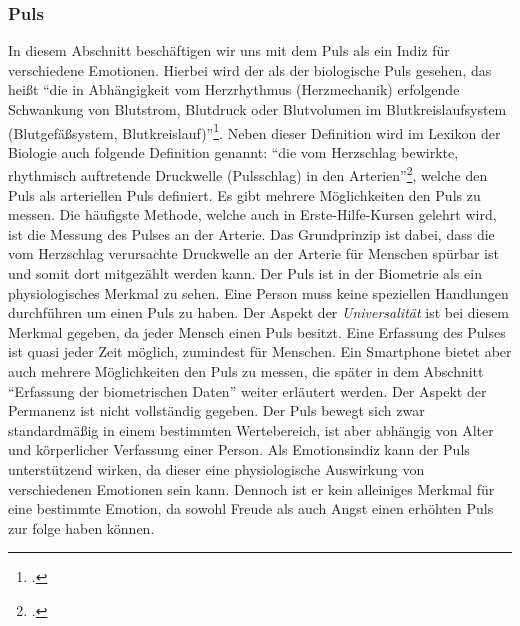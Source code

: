 \subsubsection{Puls}
In diesem Abschnitt beschäftigen wir uns mit dem Puls als ein Indiz für verschiedene Emotionen. Hierbei wird der als der biologische Puls gesehen, das heißt ``die in Abhängigkeit vom Herzrhythmus (Herzmechanik) erfolgende Schwankung von Blutstrom, Blutdruck oder Blutvolumen im Blutkreislaufsystem (Blutgefäßsystem, Blutkreislauf)''\footcite{Spe18}. Neben dieser Definition wird im Lexikon der Biologie auch folgende Definition genannt: ``die vom Herzschlag bewirkte, rhythmisch auftretende Druckwelle (Pulsschlag) in den Arterien''\footcite{Spe18}, welche den Puls als arteriellen Puls definiert. \newline
Es gibt mehrere Möglichkeiten den Puls zu messen. Die häufigste Methode, welche auch in Erste-Hilfe-Kursen gelehrt wird, ist die Messung des Pulses an der Arterie. Das Grundprinzip ist dabei, dass die vom Herzschlag verursachte Druckwelle an der Arterie für Menschen spürbar ist und somit dort mitgezählt werden kann.\newline
Der Puls ist in der Biometrie als ein physiologisches Merkmal zu sehen. Eine Person muss keine speziellen Handlungen durchführen um einen Puls zu haben. Der Aspekt der \textit{Universalität} ist bei diesem Merkmal gegeben, da jeder Mensch einen Puls besitzt. Eine Erfassung des Pulses ist quasi jeder Zeit möglich, zumindest für Menschen. Ein Smartphone bietet aber auch mehrere Möglichkeiten den Puls zu messen, die später in dem Abschnitt ``Erfassung der biometrischen Daten'' weiter erläutert werden. Der Aspekt der Permanenz ist nicht vollständig gegeben. Der Puls bewegt sich zwar standardmäßig in einem bestimmten Wertebereich, ist aber abhängig von Alter und körperlicher Verfassung einer Person.\newline
Als Emotionsindiz kann der Puls unterstützend wirken, da dieser eine physiologische Auswirkung von verschiedenen Emotionen sein kann. Dennoch ist er kein alleiniges Merkmal für eine bestimmte Emotion, da sowohl Freude als auch Angst einen erhöhten Puls zur folge haben können.
